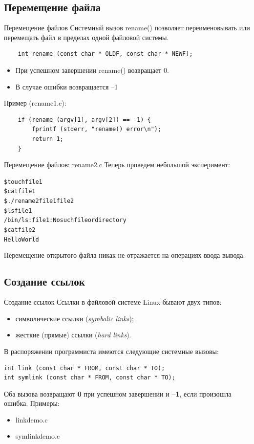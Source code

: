 \documentclass[xcolor=table]{beamer}
\begin{document}
\subsection{Перемещение файла}

\begin{frame}[fragile]{Перемещение файлов}
	Системный вызов rename() позволяет переименовывать или перемещать файл в пределах одной файловой системы.
	\begin{verbatim}
	int rename (const char * OLDF, const char * NEWF);
	\end{verbatim}
	\begin{itemize}
		\item При успешном завершении rename() возвращает 0. 
		\item В случае ошибки возвращается –1
	\end{itemize}
	Пример (rename1.c):
	\begin{verbatim}
    if (rename (argv[1], argv[2]) == -1) {
        fprintf (stderr, "rename() error\n");
        return 1;
    }    
	\end{verbatim}
\end{frame}

\begin{frame}[fragile]{Перемещение файлов: rename2.c}
	Теперь проведем небольшой эксперимент:
	\begin{alltt}
		\$ touch file1
		\$ cat file1
		\$ ./rename2 file1 file2
		\$ ls file1
		/bin/ls: file1: No such file or directory
		\$ cat file2
		Hello World
	\end{alltt}
	Перемещение открытого файла никак не отражается на операциях ввода-вывода.
\end{frame}

\subsection{Создание ссылок}

\begin{frame}[fragile]{Создание ссылок}
	Ссылки в файловой системе Linux бывают двух типов:
	\begin{itemize}
		\item символические ссылки (\textit{symbolic links});
		\item жесткие (прямые) ссылки (\textit{hard links}).
	\end{itemize}
	В распоряжении программиста имеются следующие системные вызовы:
	\begin{verbatim}
int link (const char * FROM, const char * TO);
int symlink (const char * FROM, const char * TO);
	\end{verbatim}
	Оба вызова возвращают \textbf{0} при успешном завершении и \textbf{–1}, если произошла ошибка.
	Примеры: 
	\begin{itemize}
		\item linkdemo.c
		\item symlinkdemo.c
	\end{itemize}
\end{frame}
\end{document}
